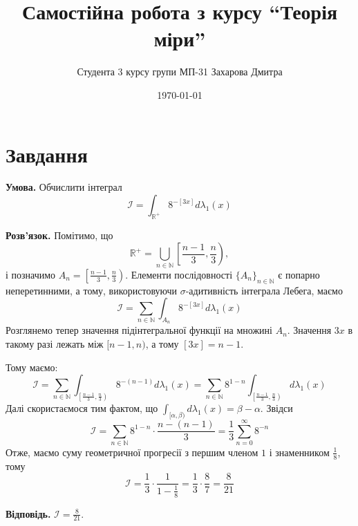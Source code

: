 \documentclass[14pt]{extarticle}
\title{Самостійна робота з курсу ``Теорія міри''}
\author{Студента 3 курсу групи МП-31 Захарова Дмитра}
\date{\today}
\begin{document}
\maketitle

\section*{Завдання}
\textbf{Умова.} Обчислити інтеграл
\[
\mathcal{I} = \int_{\mathbb{R}^+}8^{-[3x]}d\lambda_1(x)
\]

\textbf{Розв'язок.} Помітимо, що
\[
\mathbb{R}^+ = \bigcup_{n \in \mathbb{N}}\left[\frac{n-1}{3},\frac{n}{3}\right),
\]
і позначимо $A_n=\left[\frac{n-1}{3},\frac{n}{3}\right)$. Елементи послідовності $\{A_n\}_{n \in \mathbb{N}}$ є попарно неперетинними, а тому, використовуючи $\sigma$-адитивність інтеграла Лебега, маємо
\[
\mathcal{I} = \sum_{n \in \mathbb{N}}\int_{A_n}8^{-[3x]}d\lambda_1(x)
\]
Розглянемо тепер значення підінтегральної функції на множині $A_n$. Значення $3x$ в такому разі лежать між $[n-1,n)$, а тому $[3x]=n-1$. 

Тому маємо:
\[
\mathcal{I} = \sum_{n \in \mathbb{N}} \int_{\left[\frac{n-1}{3},\frac{n}{3}\right)}8^{-(n-1)}d\lambda_1(x) = \sum_{n \in \mathbb{N}} 8^{1-n} \int_{\left[\frac{n-1}{3},\frac{n}{3}\right)}d\lambda_1(x)
\]
Далі скористаємося тим фактом, що $\int_{[\alpha,\beta)}d\lambda_1(x) = \beta-\alpha$. Звідси
\[
\mathcal{I} = \sum_{n \in \mathbb{N}} 8^{1-n} \cdot \frac{n-(n-1)}{3} = \frac{1}{3}\sum_{n=0}^{\infty}8^{-n}
\]
Отже, маємо суму геометричної прогресії з першим членом $1$ і знаменником $\frac{1}{8}$, тому
\[
\mathcal{I} = \frac{1}{3} \cdot \frac{1}{1-\frac{1}{8}} = \frac{1}{3} \cdot \frac{8}{7} = \frac{8}{21}
\]

\textbf{Відповідь.} $\mathcal{I} = \frac{8}{21}$.
\end{document}
